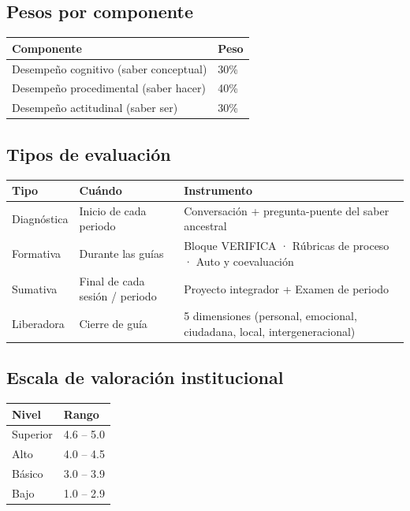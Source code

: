 \documentclass[12pt, a4paper]{article}
\begin{document}
\subsection{Pesos por componente}

\begin{center}
\begin{tabular}{|L{8cm}|L{3cm}|}
\hline
{}
\color{white}\textbf{Componente} & \color{white}\textbf{Peso} \\
\hline
Desempeño cognitivo (saber conceptual) & 30\% \\
\hline
Desempeño procedimental (saber hacer) & 40\% \\
\hline
Desempeño actitudinal (saber ser) & 30\% \\
\hline
\end{tabular}
\end{center}

\subsection{Tipos de evaluación}

\begin{center}
\begin{tabular}{|L{2.5cm}|L{3.5cm}|L{7cm}|}
\hline
{}
\color{white}\textbf{Tipo} &
\color{white}\textbf{Cuándo} &
\color{white}\textbf{Instrumento} \\
\hline
Diagnóstica &
Inicio de cada periodo &
Conversación + pregunta-puente del saber ancestral \\
\hline
Formativa &
Durante las guías &
Bloque VERIFICA · Rúbricas de proceso · Auto y coevaluación \\
\hline
Sumativa &
Final de cada sesión / periodo &
Proyecto integrador + Examen de periodo \\
\hline
Liberadora &
Cierre de guía &
5 dimensiones (personal, emocional, ciudadana, local, intergeneracional) \\
\hline
\end{tabular}
\end{center}

\subsection{Escala de valoración institucional}

\begin{center}
\begin{tabular}{|L{4cm}|L{3cm}|}
\hline
{}
\color{white}\textbf{Nivel} & \color{white}\textbf{Rango} \\
\hline
Superior & 4.6 – 5.0 \\
\hline
Alto & 4.0 – 4.5 \\
\hline
Básico & 3.0 – 3.9 \\
\hline
Bajo & 1.0 – 2.9 \\
\hline
\end{tabular}
\end{center}
\end{document}
